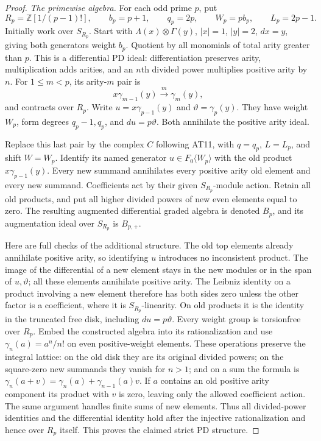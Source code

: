 \begin{proof}
\emph{The primewise algebra.}
For each odd prime $p$, put
\[
 R_p=\mathbb Z[1/(p-1)!],\qquad b_p=p+1,
 \qquad q_p=2p,\qquad W_p=p b_p,\qquad L_p=2p-1.
\]
Initially work over $S_{R_p}$.  Start with
$\Lambda(x)\otimes\Gamma(y)$, $|x|=1$, $|y|=2$,
$dx=y$, giving both generators weight $b_p$.
Quotient by all monomials of total arity greater than $p$.
This is a differential PD ideal: differentiation preserves
arity, multiplication adds arities, and an $n$th divided
power multiplies positive arity by $n$.
For $1\leq m<p$, its arity-$m$ pair is
\[
 x\gamma_{m-1}(y)\xrightarrow{\ m\ }\gamma_m(y),
 \tag{AT.36}
\]
and contracts over $R_p$.  Write
$u=x\gamma_{p-1}(y)$ and $\vartheta=\gamma_p(y)$.
They have weight $W_p$, form degrees $q_p-1,q_p$,
and $du=p\vartheta$.  Both annihilate the positive
arity ideal.

Replace this last pair by the complex $C$ following
AT11, with $q=q_p$, $L=L_p$, and shift $W=W_p$.
Identify its named generator $u\in F_0\langle W_p\rangle$
with the old product $x\gamma_{p-1}(y)$.
Every new summand annihilates every positive arity old
element and every new summand.  Coefficients act by their
given $S_{R_p}$-module action.  Retain all old products,
and put all higher divided powers of new even elements
equal to zero.  The resulting augmented differential
graded algebra is denoted $B_p$, and its augmentation
ideal over $S_{R_p}$ is $B_{p,+}$.

Here are full checks of the additional structure.  The
old top elements already annihilate positive arity, so
identifying $u$ introduces no inconsistent product.
The image of the differential of a new element stays
in the new modules or in the span of $u,\vartheta$;
all these elements annihilate positive arity.  The
Leibniz identity on a product involving a new element
therefore has both sides zero unless the other factor
is a coefficient, where it is $S_{R_p}$-linearity.
On old products it is the identity in the truncated
free disk, including $du=p\vartheta$.
Every weight group is torsionfree over $R_p$.
Embed the constructed algebra into its rationalization
and use $\gamma_n(a)=a^n/n!$ on even positive-weight
elements.  These operations preserve the integral
lattice: on the old disk they are its original divided
powers; on the square-zero new summands they vanish for
$n>1$; and on a sum the formula is
$\gamma_n(a+v)=\gamma_n(a)+\gamma_{n-1}(a)v$.
If $a$ contains an old positive arity component its
product with $v$ is zero, leaving only the allowed
coefficient action.  The same argument handles finite
sums of new elements.  Thus all divided-power identities
and the differential identity hold after the injective
rationalization and hence over $R_p$ itself.
This proves the claimed strict PD structure.


\end{proof}
